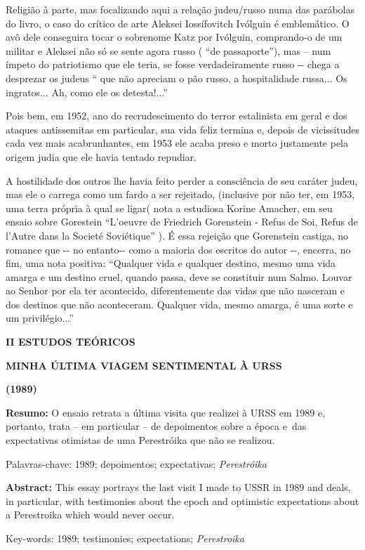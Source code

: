 Religião à parte, mas focalizando aqui a relação judeu/russo numa das
parábolas do livro, o caso do crítico de arte Aleksei Iossífovitch
Ivólguin é emblemático. O avô dele conseguira tocar o sobrenome Katz por
Ivólguin, comprando-o de um militar e Aleksei não só se sente agora
russo ( ``de passaporte''), mas -- num ímpeto do patriotismo que ele
teria, se fosse verdadeiramente russo -\/- chega a desprezar os judeus
`` que não apreciam o pão russo, a hospitalidade russa... Os ingratos...
Ah, como ele os detesta!...''

Pois bem, em 1952, ano do recrudescimento do terror estalinista em geral
e dos ataques antissemitas em particular, sua vida feliz termina e,
depois de vicissitudes cada vez mais acabrunhantes, em 1953 ele acaba
preso e morto justamente pela origem judia que ele havia tentado
repudiar.

A hostilidade dos outros lhe havia feito perder a consciência de seu
caráter judeu, mas ele o carrega como um fardo a ser rejeitado,
(inclusive por não ter, em 1953, uma terra própria à qual se ligar( nota
a estudiosa Korine Amacher, em seu ensaio sobre Gorestein ``L'oeuvre de
Friedrich Gorenstein - Refus de Soi, Refus de l'Autre dans la Societé
Soviétique'' ). É essa rejeição que Gorenstein castiga, no romance que
-\/- no entanto-\/- como a maioria dos escritos do autor -\/-, encerra,
no fim, uma nota positiva: ``Qualquer vida e qualquer destino, mesmo uma
vida amarga e um destino cruel, quando passa, deve se constituir num
Salmo. Louvar ao Senhor por ela ter acontecido, diferentemente das vidas
que não nasceram e dos destinos que não aconteceram. Qualquer vida,
mesmo amarga, é uma sorte e um privilégio...''

\textbf{II ESTUDOS TEÓRICOS}

\textbf{MINHA ÚLTIMA VIAGEM SENTIMENTAL À URSS}

\textbf{(1989)}

\textbf{Resumo:} O ensaio retrata a última visita que realizei à URSS em
1989 e, portanto, trata -- em particular -- de depoimentos sobre a época
e~das expectativas otimistas de uma Perestróika que não se realizou.

Palavras-chave: 1989; depoimentos; expectativas; \emph{Perestróika}

\textbf{Abstract:} This essay portrays the last visit I made to USSR in
1989 and deals, in particular, with testimonies about the epoch and
optimistic expectations about a Perestroika which would never occur.

Key-words: 1989; testimonies; expectations; \emph{Perestroika}

